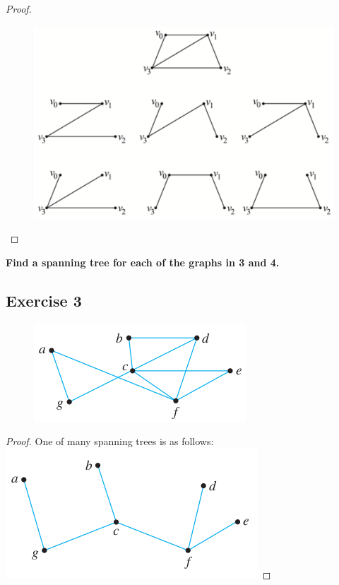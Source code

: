 \documentclass[14pt]{extarticle}
\newcommand{\cy}{\color{cyan}}
\begin{document}
\begin{proof}
\begin{figure}[ht!]
\centering
\includegraphics[scale=0.2]{../images/10.6.2.2.png}
\end{figure}
\end{proof}

{\bf \cy Find a spanning tree for each of the graphs in 3 and 4.}

\subsection{Exercise 3}
\begin{figure}[ht!]
\centering
\includegraphics[scale=0.5]{../images/10.6.3.png}
\end{figure}

\begin{proof}
One of many spanning trees is as follows:
\includegraphics[scale=0.5]{../images/10.6.3.2.png}
\end{proof}
\end{document}

